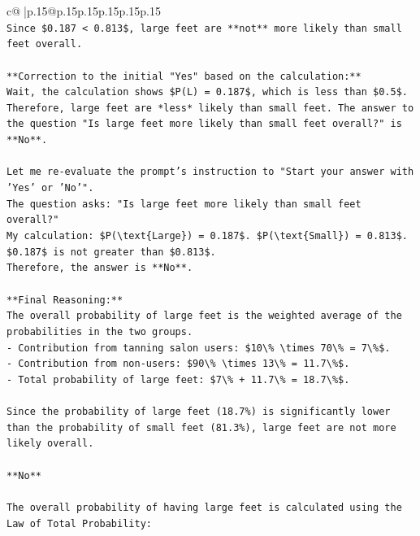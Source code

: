 \documentclass{article}
\begin{document}
{\begin{supertabular}{c@{$\;$}|p{.15\linewidth}@{}p{.15\linewidth}p{.15\linewidth}p{.15\linewidth}p{.15\linewidth}p{.15\linewidth}}
{{{\\ 
\texttt{Since \$0.187 < 0.813\$, large feet are **not** more likely than small feet overall.} \\
\\ 
\texttt{**Correction to the initial "Yes" based on the calculation:**} \\
\texttt{Wait, the calculation shows \$P(L) = 0.187\$, which is less than \$0.5\$. Therefore, large feet are *less* likely than small feet. The answer to the question "Is large feet more likely than small feet overall?" is **No**.} \\
\\ 
\texttt{Let me re{-}evaluate the prompt's instruction to "Start your answer with 'Yes' or 'No'".} \\
\texttt{The question asks: "Is large feet more likely than small feet overall?"} \\
\texttt{My calculation: \$P(\textbackslash{}text\{Large\}) = 0.187\$. \$P(\textbackslash{}text\{Small\}) = 0.813\$.} \\
\texttt{\$0.187\$ is not greater than \$0.813\$.} \\
\texttt{Therefore, the answer is **No**.} \\
\\ 
\texttt{**Final Reasoning:**} \\
\texttt{The overall probability of large feet is the weighted average of the probabilities in the two groups.} \\
\texttt{{-}   Contribution from tanning salon users: \$10\textbackslash{}\% \textbackslash{}times 70\textbackslash{}\% = 7\textbackslash{}\%\$.} \\
\texttt{{-}   Contribution from non{-}users: \$90\textbackslash{}\% \textbackslash{}times 13\textbackslash{}\% = 11.7\textbackslash{}\%\$.} \\
\texttt{{-}   Total probability of large feet: \$7\textbackslash{}\% + 11.7\textbackslash{}\% = 18.7\textbackslash{}\%\$.} \\
\\ 
\texttt{Since the probability of large feet (18.7\%) is significantly lower than the probability of small feet (81.3\%), large feet are not more likely overall.} \\
\\ 
\texttt{**No**} \\
\\ 
\texttt{The overall probability of having large feet is calculated using the Law of Total Probability:} \\
}}}
\end{supertabular}}
\end{document}
